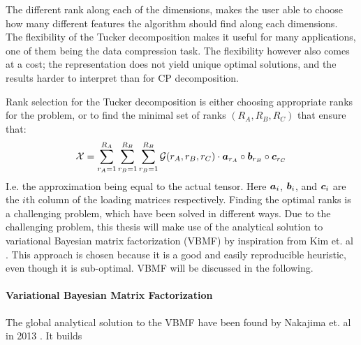 The different rank along each of the dimensions, makes the user able to choose how many different features the algorithm should find along each dimensions. The flexibility of the Tucker decomposition makes it useful for many applications, one of them being the data compression task. The flexibility however also comes at a cost; the representation does not yield unique optimal solutions, and the results harder to interpret than for CP decomposition.

Rank selection for the Tucker decomposition is either choosing appropriate ranks for the problem, or to find the minimal set of ranks $(R_A, R_B, R_C)$ that ensure that:
\begin{equation}
    \mathcal{X} = \sum_{r_A=1}^{R_A} \sum_{r_B=1}^{R_B}
 \sum_{r_B=1}^{R_B} \mathcal{G}(r_A, r_B, r_C) \cdot \boldsymbol{a}_{r_A} \circ \boldsymbol{b}_{r_B} \circ \boldsymbol{c}_{r_C}
 \end{equation}
I.e. the approximation being equal to the actual tensor. Here $\boldsymbol{a}_i$, $\boldsymbol{b}_i$, and $\boldsymbol{c}_i$ are the $i$th column of the loading matrices respectively. Finding the optimal ranks is a challenging problem, which have been solved in different ways. Due to the challenging problem, this thesis will make use of the analytical solution to variational Bayesian matrix factorization (VBMF) by inspiration from Kim et. al \cite{Kim2016}. This approach is chosen because it is a good and easily reproducible heuristic, even though it is sub-optimal. VBMF will be discussed in the following.

\paragraph{Variational Bayesian Matrix Factorization}
The global analytical solution to the VBMF have been found by Nakajima et. al in 2013 \cite{Nakajima2013}. It builds 

